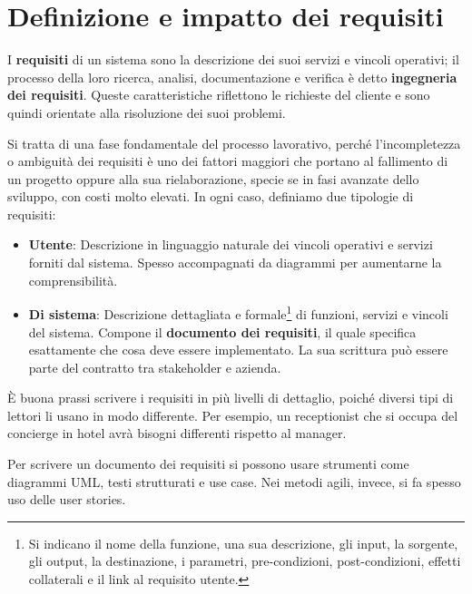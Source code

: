 \section{Definizione e impatto dei requisiti}
I \textbf{requisiti} di un sistema sono la descrizione dei suoi servizi e vincoli operativi; il processo della loro ricerca, analisi, documentazione e
verifica è detto \textbf{ingegneria dei requisiti}. Queste caratteristiche riflettono le richieste del cliente e sono quindi orientate alla risoluzione
dei suoi problemi.\par
Si tratta di una fase fondamentale del processo lavorativo, perché l'incompletezza o ambiguità dei requisiti è uno dei fattori maggiori che portano al
fallimento di un progetto oppure alla sua rielaborazione, specie se in fasi avanzate dello sviluppo, con costi molto elevati. In ogni caso, definiamo
due tipologie di requisiti: \begin{itemize}
	\item \textbf{Utente}: Descrizione in linguaggio naturale dei vincoli operativi e servizi forniti dal sistema. Spesso accompagnati da diagrammi per
	aumentarne la comprensibilità.
	\item \textbf{Di sistema}: Descrizione dettagliata e formale\footnote{Si indicano il nome della funzione, una sua descrizione, gli input, la
	sorgente, gli output, la destinazione, i parametri, pre-condizioni, post-condizioni, effetti collaterali e il link al requisito utente.} di
	funzioni, servizi e vincoli del sistema. Compone il \textbf{documento dei requisiti}, il quale specifica esattamente che cosa deve essere
	implementato. La sua scrittura può essere parte del contratto tra stakeholder e azienda.
\end{itemize}
\noindent È buona prassi scrivere i requisiti in più livelli di dettaglio, poiché diversi tipi di lettori li usano in modo differente. Per esempio, un
receptionist che si occupa del concierge in hotel avrà bisogni differenti rispetto al manager.\par
Per scrivere un documento dei requisiti si possono usare strumenti come diagrammi UML, testi strutturati e use case. Nei metodi agili, invece, si fa
spesso uso delle user stories.\newline

